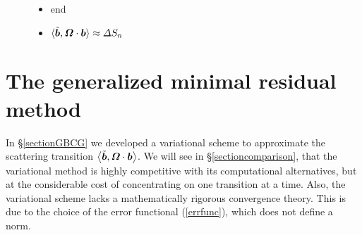 \begin{figure}
\begin{center}
{\begin{minipage} {140.0mm}
\begin{itemize}
\begin{itemize}
		
		\item  ${\mit \Delta}{S}_{n}    =\ {\mit \Delta}{S}_{n-1}+{ \alpha 
}_{n}{ \rho }_{n-1}$
		
        \item  ${\bmi  r}_{n} \ \ \  =\ {\bmi  r}_{n-1}-{ \alpha }_{n} 
{\bmi  q}_{n}$

        \item  $\tilde{\bmi  r}{}_{n} \ \ \  =\ \tilde{\bmi  
r}{}_{n-1}-\tilde{\alpha }{}_{n} \tilde{\bmi  q}{}_{n}$
		
	\end{itemize}
	\item{\bmi  e}{\bmi  n}{\bmi  d}
	
	\item $\langle{\tilde{\mbox{\boldmath$\mit b$\unboldmath}}, {\mbox{\boldmath$\mit \Omega$\unboldmath}} \cdot {\mbox{\boldmath$\mit b$\unboldmath}}}\rangle\approx 
{\mit \Delta} {S}_{n}$
\end{itemize}
\end{minipage}
}
\end{center}
\end{figure}



\section{The generalized minimal residual method}
In \S\ref{sectionGBCG} we developed a variational scheme to approximate 
the 
scattering transition  $\left\langle{\tilde{\mbox{\boldmath$\mit b$\unboldmath}}, 
{\mbox{\boldmath$\mit \Omega$\unboldmath}} \cdot {\mbox{\boldmath$\mit b$\unboldmath}}}\right\rangle$. We will see in 
\S\ref{sectioncomparison}, that the variational
method is highly competitive with its computational alternatives, but at 
the considerable cost of concentrating on one transition at a time. Also, 
the variational scheme lacks a mathematically rigorous 
convergence theory. This is due to the choice of the error functional
(\ref{errfunc}), which does not define a norm.


